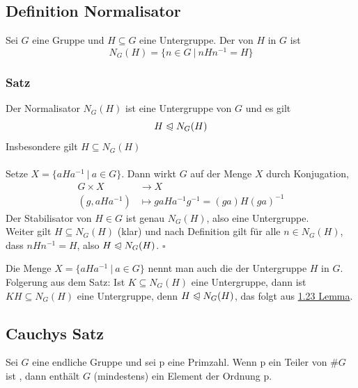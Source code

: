 \subsection{Definition Normalisator}
\label{sub:def_normalisator}
Sei $G$ eine Gruppe und $H\subseteq G$ eine Untergruppe. Der  von $H$ in $G$ ist \[N_G(H)=\{n\in G ~|~nHn^{-1}=H\} \]

\subsubsection*{Satz}
Der Normalisator $N_G(H)$ ist eine Untergruppe von $G$ und es gilt \[H\trianglelefteqslant N_G(H) \] Insbesondere gilt $H\subseteq N_G(H)$\\

\\
Setze $X=\{aHa^{-1}~|~a\in G \}$. Dann wirkt $G$ auf der Menge $X$ durch Konjugation,
\begin{equation*}
\begin{aligned}
	G\times X &\to X\\
	(g,aHa^{-1}) &\mapsto gaHa^{-1}g^{-1}=(ga)H(ga)^{-1}
\end{aligned}
\end{equation*}
Der Stabilisator von $H\in G$ ist genau $N_G(H)$, also eine Untergruppe.\\
Weiter gilt $H\subseteq N_G(H)$ (klar) und nach Definition gilt für alle $n\in N_G(H)$, dass $nHn^{-1}=H$, also $H\trianglelefteqslant N_G(H)$.
\hfill $\square$

Die Menge $X=\{aHa^{-1}~|~a\in G \}$ nennt man auch die  der Untergruppe $H$ in $G$.\\
Folgerung aus dem Satz: Ist $K\subseteq N_G(H)$ eine Untergruppe, dann ist $KH\subseteq N_G(H)$ eine Untergruppe, denn $H\trianglelefteqslant N_G(H)$, das folgt aus \hyperref[sub:isomorphiesätze]{1.23 Lemma}.

\subsection{Cauchys Satz}
\label{sub:cauchys_satz}
Sei $G$ eine endliche Gruppe und sei p eine Primzahl. Wenn p ein Teiler von $\#G$ ist , dann enthält $G$ (mindestens) ein Element der Ordnung p.\\

